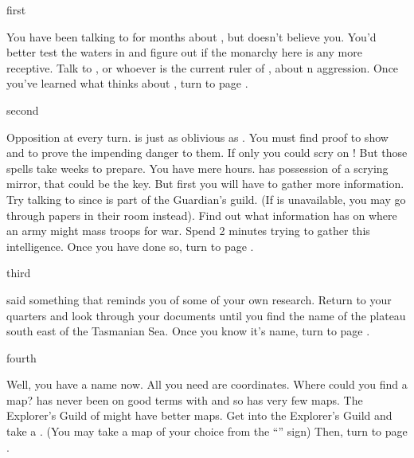 \documentclass[greennotebook]{NeptuneBall}
\begin{document}

\startnotebook{\nIndianAggression{}}

\begin{page}{first}

You have been talking to \cPrince{} for months about \pIndia{}, but \cPrince{\they} doesn't believe you. You'd better test the waters in \pAtlantis{} and figure out if the monarchy here is any more receptive. Talk to \cKing{}, or whoever is the current ruler of \pAtlantis{}, about \pIndia{}n aggression. Once you've learned what \pAtlantis{} thinks about \pIndia{}, turn to page .

\end{page}

\begin{page}{second}

Opposition at every turn. \pAtlantis{} is just as oblivious as \pPacifica{}. You must find proof to show \cPrince{} and \cKing{} to prove the impending danger to them. If only you could scry on \pIndia{}! But those spells take weeks to prepare. You have mere hours. \pAtlantis{} has possession of a scrying mirror, \iScryingMirror{} that could be the key. But first you will have to gather more information. Try talking to \cGeneral{} since \cGeneral{\they} is part of the Guardian's guild. (If \cGeneral{} is unavailable, you may go through \cGeneral{\their} papers in their room instead). Find out what information \cGeneral{} has on where an army might mass troops for war. Spend 2 minutes trying to gather this intelligence. Once you have done so, turn to page .

\end{page}

\begin{page}{third}

\cGeneral{} said something that reminds you of some of your own research. Return to your quarters and look through your documents until you find the name of the plateau south east of the Tasmanian Sea. Once you know it's name, turn to page .

\end{page}

\begin{page}{fourth} 

Well, you have a name now. All you need are coordinates. Where could you find a map? \pPacifica{} has never been on good terms with \pIndia{} and so has very few maps. The Explorer's Guild of \pAtlantis{} might have better maps. Get into the Explorer's Guild and take a \iMapOfIndia{}. (You may take a map of your choice from the ``\sPileOfMaps{}'' sign) Then, turn to page .

\end{page}
\end{document}

